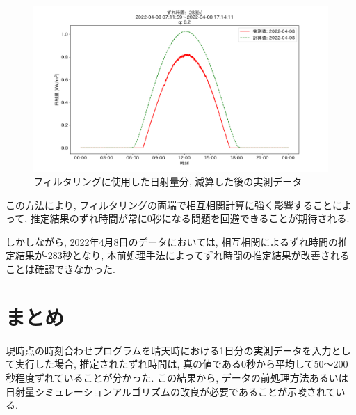 \documentclass[a4j,12pt,]{jarticle}
\begin{document}
\begin{figure}[H]
  \begin{center}
    \includegraphics[width=160mm]{2022-04-08_mask_by_q_corr.png}
    \caption{フィルタリングに使用した日射量分, 減算した後の実測データ}
    \label{p10}
  \end{center}
\end{figure}

この方法により, フィルタリングの両端で相互相関計算に強く影響することによって, 推定結果のずれ時間が常に0秒になる問題を回避できることが期待される. 

しかしながら, 2022年4月8日のデータにおいては, 相互相関によるずれ時間の推定結果が-283秒となり, 本前処理手法によってずれ時間の推定結果が改善されることは確認できなかった. 

\section{まとめ}
現時点の時刻合わせプログラムを晴天時における1日分の実測データを入力として実行した場合, 推定されたずれ時間は, 真の値である0秒から平均して50〜200秒程度ずれていることが分かった. この結果から, データの前処理方法あるいは日射量シミュレーションアルゴリズムの改良が必要であることが示唆されている. 

\end{document}
